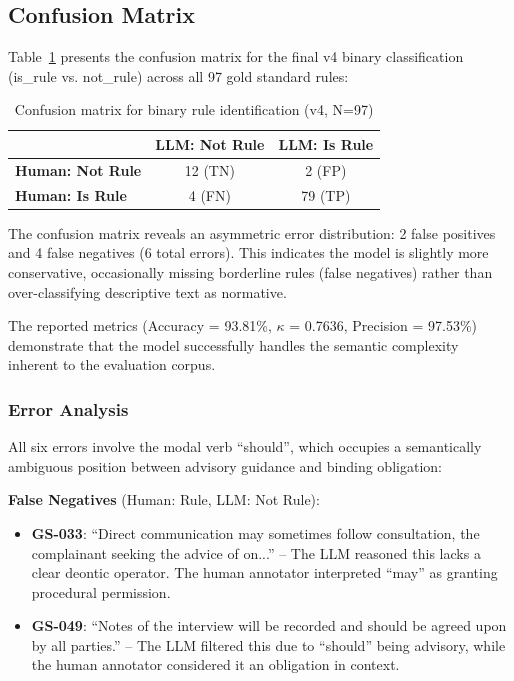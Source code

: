 \subsection{Confusion Matrix}

Table~\ref{tab:confusion-matrix} presents the confusion matrix for the final v4 binary classification (is\_rule vs. not\_rule) across all 97 gold standard rules:

\begin{table}[h]
\centering
\caption{Confusion matrix for binary rule identification (v4, N=97)}
\label{tab:confusion-matrix}
\begin{tabular}{lcc}
\toprule
 & \textbf{LLM: Not Rule} & \textbf{LLM: Is Rule} \\
\midrule
\textbf{Human: Not Rule} & 12 (TN) & 2 (FP) \\
\textbf{Human: Is Rule} & 4 (FN) & 79 (TP) \\
\bottomrule
\end{tabular}
\end{table}

The confusion matrix reveals an asymmetric error distribution: 2 false positives and 4 false negatives (6 total errors). This indicates the model is slightly more conservative, occasionally missing borderline rules (false negatives) rather than over-classifying descriptive text as normative. 

The reported metrics (Accuracy = 93.81\%, $\kappa$ = 0.7636, Precision = 97.53\%) demonstrate that the model successfully handles the semantic complexity inherent to the evaluation corpus.

\subsubsection{Error Analysis}
\label{sec:error-analysis-should}

All six errors involve the modal verb ``should'', which occupies a semantically ambiguous position between advisory guidance and binding obligation:

\textbf{False Negatives} (Human: Rule, LLM: Not Rule):
\begin{itemize}
    \item \textbf{GS-033}: ``Direct communication may sometimes follow consultation, the complainant seeking the advice of on...'' -- The LLM reasoned this lacks a clear deontic operator. The human annotator interpreted ``may'' as granting procedural permission.
    \item \textbf{GS-049}: ``Notes of the interview will be recorded and should be agreed upon by all parties.'' -- The LLM filtered this due to ``should'' being advisory, while the human annotator considered it an obligation in context.
\end{itemize}

